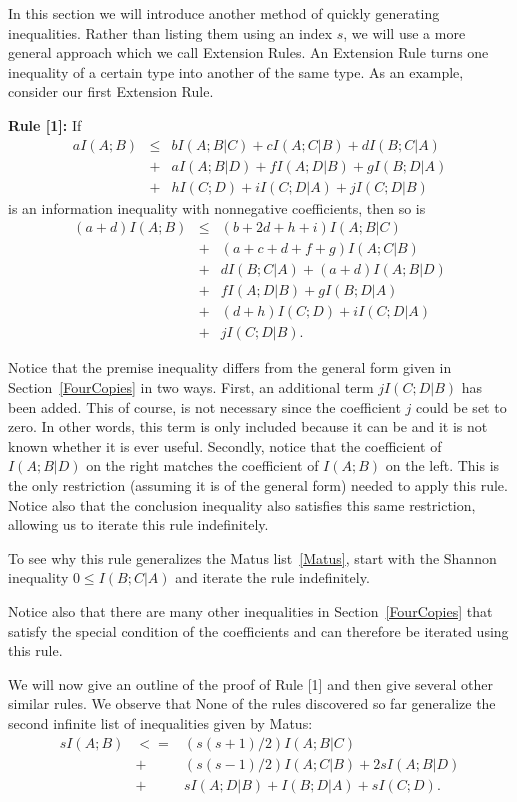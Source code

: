 \documentclass[10pt,journal]{IEEEtran}
\begin{document}
In this section we will introduce another method of quickly generating inequalities.  Rather than
listing them using an index $s$, we will use a more general approach which we call Extension Rules.
An Extension Rule turns one inequality of a certain type into another of the same type.
As an example, consider our first Extension Rule.

{\bf Rule [1]:} If
\begin{eqnarray*}
   aI(A;B)&\leq&bI(A;B|C)+cI(A;C|B)+dI(B;C|A)\\
   &+&aI(A;B|D)+fI(A;D|B)+gI(B;D|A)\\
   &+&hI(C;D)+iI(C;D|A)+jI(C;D|B)
\end{eqnarray*}
is an information inequality with nonnegative coefficients, then so is
\begin{eqnarray*}
    (a+d)I(A;B)&\leq&(b+2d+h+i)I(A;B|C)\\
    &+&(a+c+d+f+g)I(A;C|B)\\
    &+&dI(B;C|A)+(a+d)I(A;B|D)\\
    &+&fI(A;D|B)+gI(B;D|A)\\
    &+&(d+h)I(C;D)+iI(C;D|A)\\
    &+&jI(C;D|B).
\end{eqnarray*}

Notice that the premise inequality differs from the general form given in Section~\ref{FourCopies} in two ways.
First, an additional term $jI(C;D|B)$ has been added.  This of course, is not necessary since the coefficient
$j$ could be set to zero.  In other words, this term is only included because it can be and it is not
known whether it is ever useful.  Secondly, notice that the coefficient of $I(A;B|D)$ on the right matches the
coefficient of $I(A;B)$ on the left.  This is the only restriction (assuming it is of the general form)
needed to apply this rule.  Notice also that the conclusion inequality also satisfies this same restriction,
allowing us to iterate this rule indefinitely.

To see why this rule generalizes the Matus list~\eqref{Matus}, start with the Shannon inequality
$0 \leq I(B;C|A)$ and iterate the rule indefinitely.

Notice also that there are many other inequalities in Section~\ref{FourCopies} that satisfy
the special condition of the coefficients and can therefore be iterated using this rule.

We will now give an outline of the proof of Rule [1] and then give several other similar rules.
We observe that None of the rules discovered so far generalize the second infinite list of inequalities given by Matus:
\begin{eqnarray}
sI(A;B)&<=&(s(s+1)/2)I(A;B|C)\\
\nonumber &+&(s(s-1)/2)I(A;C|B)+2sI(A;B|D)\\
\nonumber &+&sI(A;D|B)+I(B;D|A)+sI(C;D).
\end{eqnarray}
\end{document}
